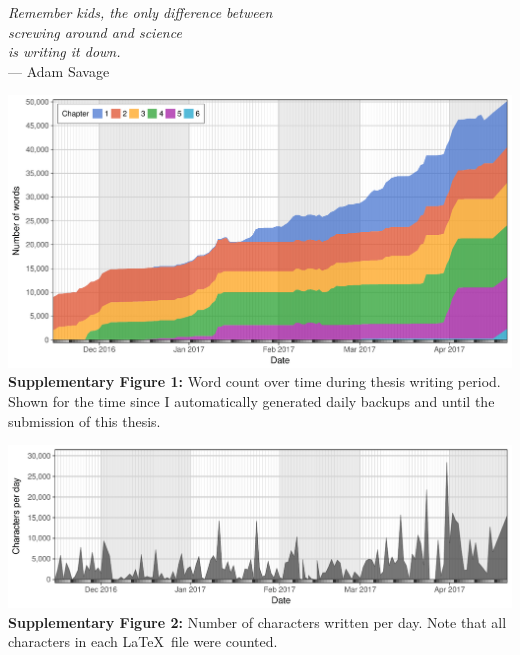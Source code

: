 \documentclass[a4paper,twoside]{dphilthesis}
\begin{document}
\thispagestyle{empty}
\null
\newpage
\thispagestyle{empty}

\vspace*{-14ex}
\begin{flushleft}
\singlespacing
\footnotesize
\textsl{%
Remember kids, the only difference between \\
screwing around and science \\
is writing it down.} \\
\hspace{4cm}--- Adam Savage
\end{flushleft}

\vspace*{2ex}

\begin{flushleft}
\includegraphics[width=\textwidth]{./img/stat_wordcount}
\vspace*{-5ex}
\small\singlespacing\textbf{Supplementary Figure 1:} Word count over time during thesis writing period. Shown for the time since I automatically generated daily backups and until the submission of this thesis.
\end{flushleft}

\vspace*{2ex}

\begin{flushleft}
\includegraphics[width=\textwidth]{./img/stat_charrate}
\vspace*{-5ex}
\small\singlespacing\textbf{Supplementary Figure 2:} Number of characters written per day. Note that all characters in each \LaTeX~file were counted.
\end{flushleft}
\end{document}
